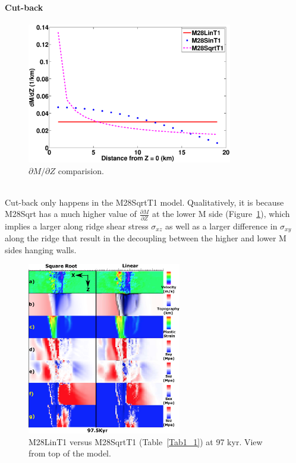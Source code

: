 \paragraph{Cut-back}

\begin{figure}[h]
  \centering
    \includegraphics[width=0.8\textwidth]{./Figures/fig_Results_3_3_1_M_type_plot_dM_dZ.eps}
  \caption{$\partial M/ \partial Z$ comparision.}
 \label{fig_Results_3_3_1_M_type_plot_dM_dZ}
\end{figure}  

~\\
Cut-back only happens in the M28SqrtT1 model. Qualitatively, it is because M28Sqrt has a much higher value of $\frac{\partial M}{\partial Z}$ at the lower M side (Figure~\hyperref[fig_Results_3_3_1_M_type_plot_dM_dZ]{\ref{fig_Results_3_3_1_M_type_plot_dM_dZ}}), which implies a larger along ridge shear stress $\sigma_{xz}$ as well as a larger difference in $\sigma_{xy}$ along the ridge that result in the decoupling between the higher and lower M sides hanging walls. 

\iffalse
\begin{figure}[h]
  \centering
    \includegraphics[width=0.6\textwidth]{./Figures/fig_Results4_3_sqrt_vs_lin_cut_back_97kyr.eps}
  \caption{M28LinT1 versus M28SqrtT1 (Table~\hyperref[Tab1_1]{\ref{Tab1_1}}) at 97 kyr. View from top of the model.}
 \label{fig_Results4_3_1}
\end{figure}  

